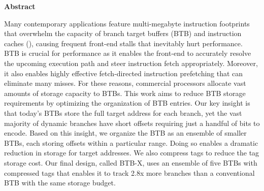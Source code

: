 \documentclass[../../../main.tex]{subfiles}
\begin{document}
\begin{center}
  \textbf{Abstract}
  \end{center}
\begin{changemargin}{0.75cm}{0.75cm}
Many contemporary applications feature multi-megabyte instruction footprints that overwhelm the capacity of branch target buffers (BTB) and instruction caches (), causing frequent front-end stalls that inevitably hurt performance. BTB is crucial for performance as it enables the front-end to accurately resolve the upcoming execution path and steer instruction fetch appropriately. Moreover, it also enables highly effective fetch-directed instruction prefetching that can eliminate many  misses. For these reasons, commercial processors allocate vast amounts of storage capacity to BTBs. This work aims to reduce BTB storage requirements by optimizing the organization of BTB entries. Our key insight is that today's BTBs store the full target address for each branch, yet the vast majority of dynamic branches have short offsets requiring just a handful of bits to encode. Based on this insight, we organize the BTB as an ensemble of smaller BTBs, each storing offsets within a particular range. Doing so enables a dramatic reduction in storage for target addresses. We also compress tags to reduce the tag storage cost. Our final design, called BTB-X, uses an ensemble of five BTBs with compressed tags that enables it to track 2.8x more branches than a conventional BTB with the same storage budget.
 \end{changemargin}

\vspace{1cm}

\begin{refsection}
  
  \printbibliography[heading=refs]
\end{refsection}
\FloatBarrier
\end{document}
